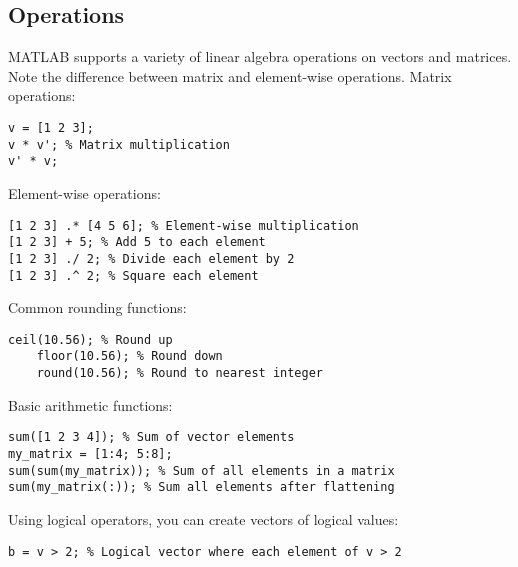 \subsection{Operations}
MATLAB supports a variety of linear algebra operations on vectors and matrices. 
Note the difference between matrix and element-wise operations.
Matrix operations: 
\begin{lstlisting}[style=MATLAB] 
v = [1 2 3]; 
v * v'; % Matrix multiplication 
v' * v; 
\end{lstlisting}
Element-wise operations:
\begin{lstlisting}[style=MATLAB] 
[1 2 3] .* [4 5 6]; % Element-wise multiplication 
[1 2 3] + 5; % Add 5 to each element 
[1 2 3] ./ 2; % Divide each element by 2 
[1 2 3] .^ 2; % Square each element
\end{lstlisting}
Common rounding functions: 
\begin{lstlisting}[style=MATLAB] 
    ceil(10.56); % Round up 
    floor(10.56); % Round down 
    round(10.56); % Round to nearest integer 
\end{lstlisting}
Basic arithmetic functions: 
\begin{lstlisting}[style=MATLAB] 
sum([1 2 3 4]); % Sum of vector elements 
my_matrix = [1:4; 5:8]; 
sum(sum(my_matrix)); % Sum of all elements in a matrix 
sum(my_matrix(:)); % Sum all elements after flattening 
\end{lstlisting}
Using logical operators, you can create vectors of logical values: 
\begin{lstlisting}[style=MATLAB] 
b = v > 2; % Logical vector where each element of v > 2
\end{lstlisting}